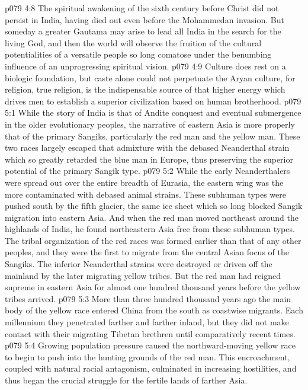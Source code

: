 \vs p079 4:8 The spiritual awakening of the sixth century before Christ did not persist in India, having died out even before the Mohammedan invasion. But someday a greater Gautama may arise to lead all India in the search for the living God, and then the world will observe the fruition of the cultural potentialities of a versatile people so long comatose under the benumbing influence of an unprogressing spiritual vision.
\vs p079 4:9 Culture does rest on a biologic foundation, but caste alone could not perpetuate the Aryan culture, for religion, true religion, is the indispensable source of that higher energy which drives men to establish a superior civilization based on human brotherhood.
\vs p079 5:1 While the story of India is that of Andite conquest and eventual submergence in the older evolutionary peoples, the narrative of eastern Asia is more properly that of the primary Sangiks, particularly the red man and the yellow man. These two races largely escaped that admixture with the debased Neanderthal strain which so greatly retarded the blue man in Europe, thus preserving the superior potential of the primary Sangik type.
\vs p079 5:2 While the early Neanderthalers were spread out over the entire breadth of Eurasia, the eastern wing was the more contaminated with debased animal strains. These subhuman types were pushed south by the fifth glacier, the same ice sheet which so long blocked Sangik migration into eastern Asia. And when the red man moved northeast around the highlands of India, he found northeastern Asia free from these subhuman types. The tribal organization of the red races was formed earlier than that of any other peoples, and they were the first to migrate from the central Asian focus of the Sangiks. The inferior Neanderthal strains were destroyed or driven off the mainland by the later migrating yellow tribes. But the red man had reigned supreme in eastern Asia for almost one hundred thousand years before the yellow tribes arrived.
\pc \vs p079 5:3 More than three hundred thousand years ago the main body of the yellow race entered China from the south as coastwise migrants. Each millennium they penetrated farther and farther inland, but they did not make contact with their migrating Tibetan brethren until comparatively recent times.
\vs p079 5:4 Growing population pressure caused the northward\hyp{}moving yellow race to begin to push into the hunting grounds of the red man. This encroachment, coupled with natural racial antagonism, culminated in increasing hostilities, and thus began the crucial struggle for the fertile lands of farther Asia.
